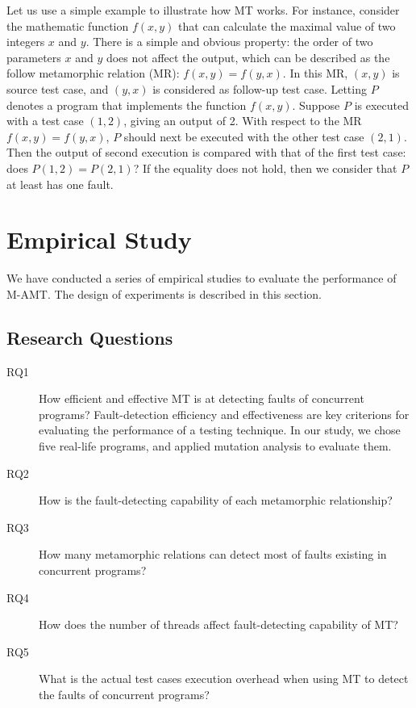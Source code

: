 \documentclass[conference]{IEEEtran}
\begin{document}
Let us use a simple example to illustrate how MT works. For instance, consider the mathematic function $f(x,y)$ that can calculate the maximal value of two integers $x$ and $y$.
There is a simple and obvious property: the order of two parameters $x$ and $y$ does not affect the output, which can be described as the follow metamorphic relation
(MR): $f(x,y) = f(y,x)$. In this MR, $(x,y)$ is source test case, and $(y,x)$ is considered as follow-up test case. Letting $P$ denotes a program that implements the
function $f(x,y)$. Suppose $P$ is executed with a test case $(1,2)$, giving an output of 2. With respect to the MR $f(x,y) = f(y,x)$, $P$ should next be executed with
the other test case $(2,1)$. Then the output of second execution is compared with that of the first test case: does $P(1,2) = P(2,1)$? If the equality does not hold, then
we consider that $P$ at least has one fault.


\section{Empirical Study}
\label{section:empirical}
We have conducted a series of empirical studies to evaluate the performance of M-AMT. The design of experiments is described in this section.

\subsection{Research Questions}
\label{section:questions}

\begin{description}
  \item [RQ1]
  How efficient and effective MT is at detecting faults of concurrent programs?
  Fault-detection efficiency and effectiveness are key criterions for evaluating the performance of a testing technique. In our study, we chose five real-life programs, and applied mutation analysis to evaluate them. 
  \item [RQ2]
  How is the fault-detecting capability of each metamorphic relationship? 
  
  \item [RQ3]
  How many metamorphic relations can detect most of faults existing in concurrent programs?
  
  \item [RQ4]
  How does the number of threads affect fault-detecting capability of MT?
  
  \item [RQ5]
  What is the actual test cases execution overhead when using MT to detect the faults of concurrent programs?

\end{description}
\end{document}
